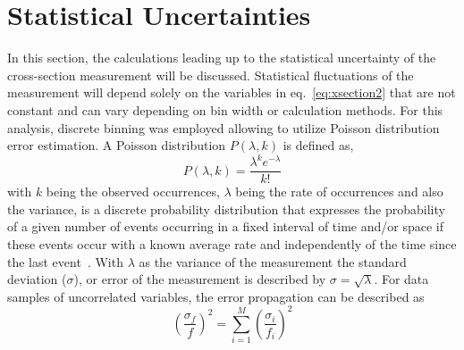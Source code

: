 \section{Statistical Uncertainties}\label{sec:results.staterrors}

In this section, the calculations leading up to the statistical uncertainty of the cross-section measurement will be discussed. Statistical fluctuations of the measurement will depend solely on the variables in eq.~\ref{eq:xsection2} that are not constant and can vary depending on bin width or calculation methods. For this analysis, discrete binning was employed allowing to utilize Poisson distribution error estimation. A Poisson distribution $P(\lambda,k)$ is defined as,
\begin{equation}
P(\lambda,k) = \frac{\lambda^k e^{-\lambda}}{k!}
\end{equation}
with $k$ being the observed occurrences, $\lambda$ being the rate of occurrences and also the variance, is a discrete probability distribution that expresses the probability of a given number of events occurring in a fixed interval of time and/or space if these events occur with a known average rate and independently of the time since the last event~\cite{Poisson}. With $\lambda$ as the variance of the measurement the standard deviation ($\sigma$), or error of the measurement is described by $\sigma = \sqrt{\lambda}$. 
For data samples of uncorrelated variables, the error propagation can be described as
\begin{equation}
\left(\frac{\sigma_f}{f}\right)^2 = \sum_{i=1}^{M}\left(\frac{\sigma_i}{f_i}\right)^2
\end{equation}

